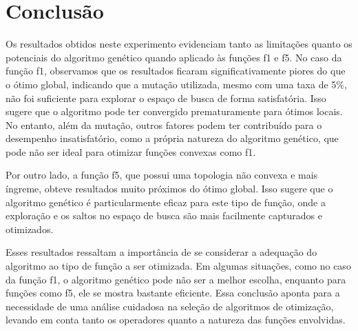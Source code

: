\section{Conclusão}%
\label{sec:conclusao}

Os resultados obtidos neste experimento evidenciam tanto as limitações quanto os potenciais do algoritmo genético quando aplicado às funções \gls{f1} e \gls{f5}. No caso da função \gls{f1}, observamos que os resultados ficaram significativamente piores do que o ótimo global, indicando que a mutação utilizada, mesmo com uma taxa de 5\%, não foi suficiente para explorar o espaço de busca de forma satisfatória. Isso sugere que o algoritmo pode ter convergido prematuramente para ótimos locais. No entanto, além da mutação, outros fatores podem ter contribuído para o desempenho insatisfatório, como a própria natureza do algoritmo genético, que pode não ser ideal para otimizar funções convexas como \gls{f1}.

Por outro lado, a função \gls{f5}, que possui uma topologia não convexa e mais íngreme, obteve resultados muito próximos do ótimo global. Isso sugere que o algoritmo genético é particularmente eficaz para este tipo de função, onde a exploração e os saltos no espaço de busca são mais facilmente capturados e otimizados.

Esses resultados ressaltam a importância de se considerar a adequação do algoritmo ao tipo de função a ser otimizada. Em algumas situações, como no caso da função \gls{f1}, o algoritmo genético pode não ser a melhor escolha, enquanto para funções como \gls{f5}, ele se mostra bastante eficiente. Essa conclusão aponta para a necessidade de uma análise cuidadosa na seleção de algoritmos de otimização, levando em conta tanto os operadores quanto a natureza das funções envolvidas.